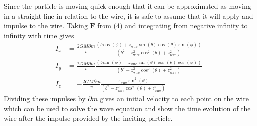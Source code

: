 \documentclass{report}
\begin{document}
Since the particle is moving quick enough that it can be approximated as moving in a straight line in relation
to the wire, it is safe to assume that it will apply and impulse to the wire. Taking $\mathbf{F}$ from (4) and 
integrating from negative infinity to infinity with time gives
\begin{align}
    I_x &= \frac{2 G M \partial m}{v} \frac{(b \cos (\phi )+z_{\text{wire}} \sin (\theta ) \cos (\theta ) \sin (\phi ))}{\left(b^2-z_{\text{wire}}^2 \cos ^2(\theta )+z_{\text{wire}}^2\right)}\\
    I_y &= \frac{2 G M \partial m}{v} \frac{(b \sin (\phi )-z_{\text{wire}} \sin (\theta ) \cos (\theta ) \cos (\phi ))}{\left(b^2-z_{\text{wire}}^2 \cos ^2(\theta )+z_{\text{wire}}^2\right)}\\
    I_z &= -\frac{2 G M \partial m}{v} \frac{z_{\text{wire}} \sin ^2(\theta )}{\left(b^2-z_{\text{wire}}^2 \cos ^2(\theta )+z_{\text{wire}}^2\right)}
\end{align}
Dividing these impulses by $\partial m$ gives an initial velocity to each point on the wire which can be used to 
solve the wave equation and show the time evolution of the wire after the impulse provided by the inciting particle.
\end{document}
